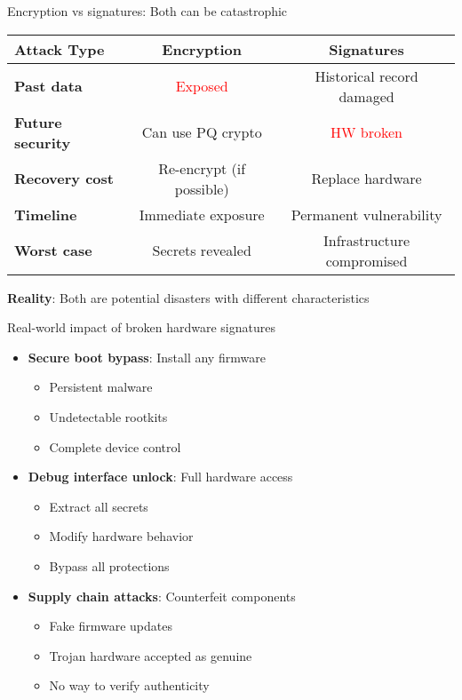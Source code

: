 \documentclass[aspectratio=169, lualatex, handout]{beamer}
\begin{document}
\begin{frame}{Encryption vs signatures: Both can be catastrophic}
	\begin{center}
		\begin{tabular}{|l|c|c|}
			\hline
			\textbf{Attack Type}     & \textbf{Encryption}      & \textbf{Signatures}        \\
			\hline
			\hline
			\textbf{Past data}       & \textcolor{red}{Exposed} & Historical record damaged  \\
			\hline
			\textbf{Future security} & Can use PQ crypto        & \textcolor{red}{HW broken} \\
			\hline
			\textbf{Recovery cost}   & Re-encrypt (if possible) & Replace hardware           \\
			\hline
			\textbf{Timeline}        & Immediate exposure       & Permanent vulnerability    \\
			\hline
			\textbf{Worst case}      & Secrets revealed         & Infrastructure compromised \\
			\hline
		\end{tabular}
	\end{center}
	\vspace{3mm}
	\begin{center}
		\textbf{Reality}: Both are potential disasters with different characteristics
	\end{center}
\end{frame}

\begin{frame}{Real-world impact of broken hardware signatures}
	\begin{itemize}
		\item \textbf{Secure boot bypass}: Install any firmware
		      \begin{itemize}
			      \item Persistent malware
			      \item Undetectable rootkits
			      \item Complete device control
		      \end{itemize}
		\item \textbf{Debug interface unlock}: Full hardware access
		      \begin{itemize}
			      \item Extract all secrets
			      \item Modify hardware behavior
			      \item Bypass all protections
		      \end{itemize}
		\item \textbf{Supply chain attacks}: Counterfeit components
		      \begin{itemize}
			      \item Fake firmware updates
			      \item Trojan hardware accepted as genuine
			      \item No way to verify authenticity
		      \end{itemize}
	\end{itemize}
\end{frame}
\end{document}
